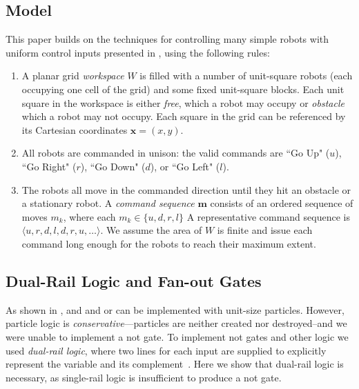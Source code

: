 \documentclass[letterpaper, 10 pt, conference]{ieeeconf}
\begin{document}
 \subsection{Model}
  
This paper builds on the techniques for controlling many simple robots with uniform control inputs presented in \cite{Becker2013f,Becker2014,Becker2014a}, using the following rules:
\begin{enumerate}
\item A planar  grid \emph{workspace} $W$ is filled with a number of unit-square robots (each occupying one cell of the grid)  and some fixed unit-square blocks.  Each unit square in the workspace is either  \emph{free}, which a robot may occupy or \emph{obstacle} which a robot may not occupy.  Each square in the grid can be referenced by its Cartesian coordinates $\bm{x}=(x,y)$.
\item All robots are commanded in unison: the valid commands are  ``Go Up" ($u$), ``Go Right" ($r$), ``Go Down" ($d$), or ``Go Left" ($l$).  
\item The robots all move in the commanded direction until they hit an obstacle or a stationary robot. A \emph{command sequence} $\bm{m}$ consists of an ordered sequence of moves $m_k$, where each $m_k\in\{u,d,r,l\}$  A representative command sequence is $\langle u,r,d,l,d,r,u,\ldots\rangle$. We assume the area of $W$ is finite and issue each command long enough for the robots to reach their maximum extent.
\end{enumerate}


 \subsection{Dual-Rail Logic and Fan-out Gates}

As shown in \cite{Becker2013f}, {\sc and} and {\sc or} can be implemented with
unit-size particles.  However, particle logic is \emph{conservative}---particles
are neither created nor destroyed--and we were unable to implement a {\sc not}
gate. To implement {\sc not} gates and other logic we used \emph{dual-rail
logic}, where two lines for each input are supplied to explicitly represent the
variable and its complement~\cite{Becker2014a}. Here we show that dual-rail
logic is necessary, as single-rail logic is insufficient to produce a {\sc not}
gate. 
\end{document}
